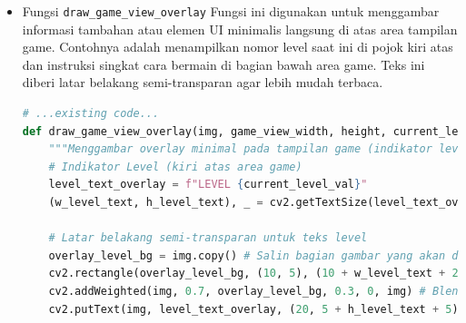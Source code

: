 \documentclass[11pt,a4paper]{article}
\begin{document}
\begin{itemize}
\begin{itemize}
\begin{lstlisting}[language=Python, caption=Fungsi draw\_modern\_game\_over]
    cv2.putText(game_over_img, title_text_go, (text_center_x_go - w_text//2, text_y_go), 
               cv2.FONT_HERSHEY_SIMPLEX, 2, config.color_schemes["text_primary"], 3)
    
    # Tampilan Skor Akhir
    score_y_go = text_y_go + 80
    score_text = f"Final Score: {final_score}"
    (w_score_text, _), _ = cv2.getTextSize(score_text, cv2.FONT_HERSHEY_SIMPLEX, 1, 2)
    cv2.putText(game_over_img, score_text, (text_center_x_go - w_score_text//2, score_y_go), 
               cv2.FONT_HERSHEY_SIMPLEX, 1, config.color_schemes["success"], 2)
    
    # Instruksi keluar
    instruction_y_go = score_y_go + 60
    instr_text = "Press any key to exit"
    (w_instr_text, _), _ = cv2.getTextSize(instr_text, cv2.FONT_HERSHEY_SIMPLEX, 0.8, 2)
    cv2.putText(game_over_img, instr_text, (text_center_x_go - w_instr_text//2, instruction_y_go), 
               cv2.FONT_HERSHEY_SIMPLEX, 0.8, config.color_schemes["text_secondary"], 2)
    
    return game_over_img
# ...existing code...
\end{lstlisting}
\item Fungsi \texttt{draw\_game\_view\_overlay}
\newline Fungsi ini digunakan untuk menggambar informasi tambahan atau elemen UI minimalis langsung di atas area tampilan game. Contohnya adalah menampilkan nomor level saat ini di pojok kiri atas dan instruksi singkat cara bermain di bagian bawah area game. Teks ini diberi latar belakang semi-transparan agar lebih mudah terbaca.
\begin{lstlisting}[language=Python, caption=Fungsi draw\_game\_view\_overlay]
# ...existing code...
def draw_game_view_overlay(img, game_view_width, height, current_level_val):
    """Menggambar overlay minimal pada tampilan game (indikator level, instruksi)."""
    # Indikator Level (kiri atas area game)
    level_text_overlay = f"LEVEL {current_level_val}"
    (w_level_text, h_level_text), _ = cv2.getTextSize(level_text_overlay, cv2.FONT_HERSHEY_SIMPLEX, 0.8, 2)
    
    # Latar belakang semi-transparan untuk teks level
    overlay_level_bg = img.copy() # Salin bagian gambar yang akan ditimpa
    cv2.rectangle(overlay_level_bg, (10, 5), (10 + w_level_text + 20, 5 + h_level_text + 10), (0, 0, 0), -1) # Background hitam
    cv2.addWeighted(img, 0.7, overlay_level_bg, 0.3, 0, img) # Blend dengan alpha
    cv2.putText(img, level_text_overlay, (20, 5 + h_level_text + 5), cv2.FONT_HERSHEY_SIMPLEX, 0.8, config.color_schemes["text_primary"], 2)
    

\end{lstlisting}
\end{itemize}
\end{itemize}
\end{document}
